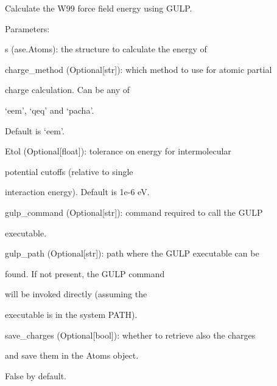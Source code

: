 \documentclass[letterpaper,10pt,english]{sphinxmanual}
\begin{document}
\begin{fulllineitems}
\label{doctree/soprano.calculate.gulp.w99:soprano.calculate.gulp.w99.get_w99_energy}
Calculate the W99 force field energy using GULP.

\begin{DUlineblock}{0em}
\item[] Parameters:
\item[]
\begin{DUlineblock}{\DUlineblockindent}
\item[] s (ase.Atoms): the structure to calculate the energy of
\item[] charge\_method (Optional{[}str{]}): which method to use for atomic partial
\item[]
\begin{DUlineblock}{\DUlineblockindent}
\item[] charge calculation. Can be any of
\item[] `eem', `qeq' and `pacha'.
\item[] Default is `eem'.
\end{DUlineblock}
\item[] Etol (Optional{[}float{]}): tolerance on energy for intermolecular
\item[]
\begin{DUlineblock}{\DUlineblockindent}
\item[] potential cutoffs (relative to single
\item[] interaction energy). Default is 1e-6 eV.
\end{DUlineblock}
\item[] gulp\_command (Optional{[}str{]}): command required to call the GULP
\item[]
\begin{DUlineblock}{\DUlineblockindent}
\item[] executable.
\end{DUlineblock}
\item[] gulp\_path (Optional{[}str{]}): path where the GULP executable can be
\item[]
\begin{DUlineblock}{\DUlineblockindent}
\item[] found. If not present, the GULP command
\item[] will be invoked directly (assuming the
\item[] executable is in the system PATH).
\end{DUlineblock}
\item[] save\_charges (Optional{[}bool{]}): whether to retrieve also the charges
\item[]
\begin{DUlineblock}{\DUlineblockindent}
\item[] and save them in the Atoms object.
\item[] False by default.
\end{DUlineblock}
\end{DUlineblock}
\end{DUlineblock}


\end{fulllineitems}
\end{document}
